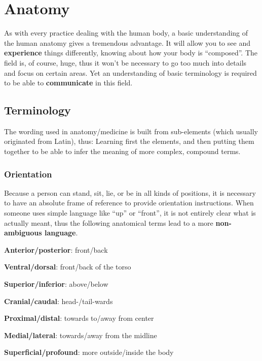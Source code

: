 \chapter{Anatomy}\label{ch:anatomy}


As with every practice dealing with the human body, a basic understanding of the human anatomy gives a tremendous advantage.
It will allow you to see and \textbf{experience} things differently, knowing about how your body is ``composed''.
The field is, of course, huge, thus it won't be necessary to go too much into details and focus on certain areas.
Yet an understanding of basic terminology is required to be able to \textbf{communicate} in this field.

\section{Terminology}\label{sec:terminology}

The wording used in anatomy/medicine is built from sub-elements (which usually originated from Latin), thus:
Learning first the elements, and then putting them together to be able to infer the meaning of more complex, compound terms.

\subsection{Orientation}

Because a person can stand, sit, lie, or be in all kinds of positions, it is necessary to have an absolute frame of reference to provide orientation instructions.
When someone uses simple language like ``up'' or ``front'', it is not entirely clear what is actually meant, thus the following anatomical terms lead to a more \textbf{non-ambiguous language}.

\begin{itemize*}
    \item \textbf{Anterior/posterior}: front/back
    \item \textbf{Ventral/dorsal}: front/back of the torso
    \item \textbf{Superior/inferior}: above/below
    \item \textbf{Cranial/caudal}: head-/tail-wards
    \item \textbf{Proximal/distal}: towards to/away from center
    \item \textbf{Medial/lateral}: towards/away from the midline
    \item \textbf{Superficial/profound}: more outside/inside the body
\end{itemize*}

